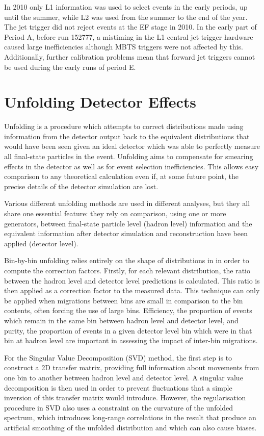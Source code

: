 In 2010 only L1 information was used to select events in the early periods, up
until the summer, while L2 was used from the summer to the end of the year. The
jet trigger did not reject events at the EF stage in 2010. In the early part of
Period A, before run 152777, a mistiming in the L1 central jet trigger hardware
caused large inefficiencies although MBTS triggers were not affected by this.
Additionally, further calibration problems mean that forward jet triggers cannot
be used during the early runs of period E.

\section{Unfolding Detector Effects}
\label{sec:analysis-tools:unfolding}
Unfolding is a procedure which attempts to correct distributions made using
information from the detector output back to the equivalent distributions that
would have been seen given an ideal detector which was able to perfectly measure
all final-state particles in the event. Unfolding aims to compensate for
smearing effects in the detector as well as for event selection inefficiencies. This
allows easy comparison to any theoretical calculation even if, at some future
point, the precise details of the detector simulation are lost.

Various different unfolding methods are used in different analyses, but they all
share one essential feature: they rely on comparison, using one or more 
generators, between final-state particle level (hadron level) information and
the equivalent information after detector simulation and reconstruction have
been applied (detector level).

Bin-by-bin unfolding relies entirely on the shape of distributions in \MC in order
to compute the correction factors. Firstly, for each relevant distribution, the
ratio between the hadron level and detector level predictions is calculated.
This ratio is then applied as a correction factor to the measured data. This
technique can only be applied when migrations between bins are small in
comparison to the bin contents, often forcing the use of large bins. Efficiency,
the proportion of events which remain in the same bin between hadron level and
detector level, and purity, the proportion of events in a given detector level
bin which were in that bin at hadron level are important in assessing the impact
of inter-bin migrations.

For the Singular Value Decomposition (SVD) method, the first step is to
construct a 2D transfer matrix, providing full information about movements from
one bin to another between hadron level and detector level. A singular value
decomposition is then used in order to prevent fluctuations that a simple
inversion of this transfer matrix would introduce. However, the regularisation
procedure in SVD also uses a constraint on the curvature of the unfolded
spectrum, which introduces long-range correlations in the result that produce an
artificial smoothing of the unfolded distribution and which can also cause
biases.

